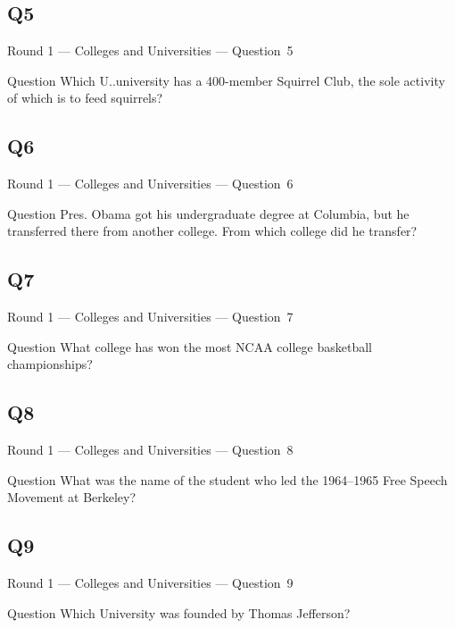 \documentclass[11pt,draft]{beamer}
\begin{document}
\subsection*{Q5}
\begin{frame}[t]{Round 1 --- Colleges and Universities --- \mbox{Question 5}}
    \begin{block}{Question}
        Which U.\@S.\@ university  has a 400-member Squirrel Club, the sole activity of which is to feed squirrels?
    \end{block}
\end{frame}
\subsection*{Q6}
\begin{frame}[t]{Round 1 --- Colleges and Universities --- \mbox{Question 6}}
    \begin{block}{Question}
        Pres. Obama got his undergraduate degree at Columbia, but he transferred there from another college. From which college did he transfer?
    \end{block}
\end{frame}
\subsection*{Q7}
\begin{frame}[t]{Round 1 --- Colleges and Universities --- \mbox{Question 7}}
    \begin{block}{Question}
        What college has won the most NCAA college basketball championships?
    \end{block}
\end{frame}
\subsection*{Q8}
\begin{frame}[t]{Round 1 --- Colleges and Universities --- \mbox{Question 8}}
    \begin{block}{Question}
        What was the name of the student who led the 1964--1965 Free Speech Movement at Berkeley?
    \end{block}
\end{frame}
\subsection*{Q9}
\begin{frame}[t]{Round 1 --- Colleges and Universities --- \mbox{Question 9}}
    \begin{block}{Question}
        Which University was founded by Thomas Jefferson?
    \end{block}
\end{frame}
\end{document}

